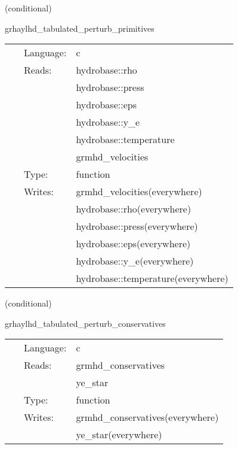 \documentclass{article}
\begin{document}
\vspace{5mm}

   (conditional) 

\hspace{5mm} grhaylhd\_tabulated\_perturb\_primitives 

\hspace{5mm}{\it tabulated version of grhaylhd\_perturb\_primitives } 


\hspace{5mm}

 \begin{tabular*}{160mm}{cll} 
~ & Language:  & c \\ 
~ & Reads:  & hydrobase::rho \\ 
~& ~ &hydrobase::press\\ 
~& ~ &hydrobase::eps\\ 
~& ~ &hydrobase::y\_e\\ 
~& ~ &hydrobase::temperature\\ 
~& ~ &grmhd\_velocities\\ 
~ & Type:  & function \\ 
~ & Writes:  & grmhd\_velocities(everywhere) \\ 
~& ~ &hydrobase::rho(everywhere)\\ 
~& ~ &hydrobase::press(everywhere)\\ 
~& ~ &hydrobase::eps(everywhere)\\ 
~& ~ &hydrobase::y\_e(everywhere)\\ 
~& ~ &hydrobase::temperature(everywhere)\\ 
\end{tabular*} 


\vspace{5mm}

   (conditional) 

\hspace{5mm} grhaylhd\_tabulated\_perturb\_conservatives 

\hspace{5mm}{\it tabulated version of grhaylhd\_perturb\_conservatives } 


\hspace{5mm}

 \begin{tabular*}{160mm}{cll} 
~ & Language:  & c \\ 
~ & Reads:  & grmhd\_conservatives \\ 
~& ~ &ye\_star\\ 
~ & Type:  & function \\ 
~ & Writes:  & grmhd\_conservatives(everywhere) \\ 
~& ~ &ye\_star(everywhere)\\ 
\end{tabular*} 
\end{document}
